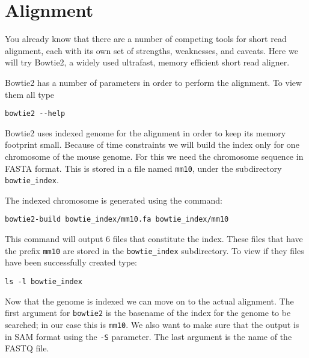 \section{Alignment}

\begin{information}
You already know that there are a number of competing tools for short read
alignment, each with its own set of strengths, weaknesses, and caveats. Here we
will try Bowtie2, a widely used ultrafast, memory efficient short read
aligner.
\end{information}

\begin{steps}
Bowtie2 has a number of parameters in order to perform the alignment. To
view them all type

\begin{lstlisting}
bowtie2 --help
\end{lstlisting}

Bowtie2 uses indexed genome for the alignment in order to keep its memory
footprint small. Because of time constraints we will build the index only for
one chromosome of the mouse genome. For this we need the chromosome sequence in
FASTA format. This is stored in a file named \texttt{mm10}, under the
subdirectory \texttt{bowtie\_index}.

The indexed chromosome is generated using the command:

\begin{lstlisting}
bowtie2-build bowtie_index/mm10.fa bowtie_index/mm10
\end{lstlisting}

This command will output 6 files that constitute the index. These files that
have the prefix \texttt{mm10} are stored in the \texttt{bowtie\_index}
subdirectory. To view if they files have been successfully created type:

\begin{lstlisting}
ls -l bowtie_index
\end{lstlisting}
\end{steps}

\begin{information}
Now that the genome is indexed we can move on to the actual alignment. The first
argument for \texttt{bowtie2} is the basename of the index for the genome to be searched;
in our case this is \texttt{mm10}. We also want to make sure that the output is
in SAM format using the \texttt{-S} parameter. The last argument is the name of the
FASTQ file.
\end{information}

